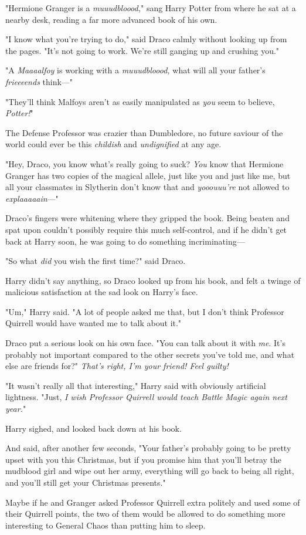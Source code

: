 "Hermione Granger is a \emph{muuudbloood,}" sang Harry Potter from where he sat 
at a nearby desk, reading a far more advanced book of his own.

"I know what you're trying to do," said Draco calmly without looking up from 
the pages. "It's not going to work. We're still ganging up and crushing you."

"A \emph{Maaaalfoy} is working with a \emph{muuudbloood,} what will all your 
father's \emph{frieeeends} think---"

"They'll think Malfoys aren't as easily manipulated as \emph{you} seem to 
believe, \emph{Potter!}"

The Defense Professor was crazier than Dumbledore, no future saviour of the 
world could ever be this \emph{childish} and \emph{undignified} at any age.

"Hey, Draco, you know what's really going to suck? \emph{You} know that 
Hermione Granger has two copies of the magical allele, just like you and just 
like me, but all your classmates in Slytherin don't know that and 
\emph{yooouuu're} not allowed to \emph{explaaaaain}---"

Draco's fingers were whitening where they gripped the book. Being beaten and 
spat upon couldn't possibly require this much self-control, and if he didn't 
get back at Harry soon, he was going to do something incriminating---

"So what \emph{did} you wish the first time?" said Draco.

Harry didn't say anything, so Draco looked up from his book, and felt a twinge 
of malicious satisfaction at the sad look on Harry's face.

"Um," Harry said. "A lot of people asked me that, but I don't think Professor 
Quirrell would have wanted me to talk about it."

Draco put a serious look on his own face. "You can talk about it with 
\emph{me}. It's probably not important compared to the other secrets you've 
told me, and what else are friends for?" \emph{That's right, I'm your friend! 
Feel guilty!}

"It wasn't really all that interesting," Harry said with obviously artificial 
lightness. "Just, \emph{I wish Professor Quirrell would teach Battle Magic 
again next year.}"

Harry sighed, and looked back down at his book.

And said, after another few seconds, "Your father's probably going to be pretty 
upset with you this Christmas, but if you promise him that you'll betray the 
mudblood girl and wipe out her army, everything will go back to being all 
right, and you'll still get your Christmas presents."

Maybe if he and Granger asked Professor Quirrell extra politely and used some 
of their Quirrell points, the two of them would be allowed to do something more 
interesting to General Chaos than putting him to sleep.
